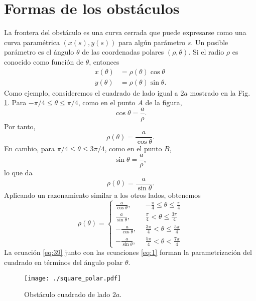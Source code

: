 \documentclass[11pt]{article}
\begin{document}
\section{Formas de los obstáculos}
La frontera del obstáculo es una curva cerrada que puede expresarse como una curva paramétrica $(x(s),y(s))$ para algún parámetro $s$. Un posible parámetro es el ángulo $\theta$ de las coordenadas polares  $(\rho, \theta)$. Si el radio $\rho$ es conocido como función de $\theta$, entonces
\begin{subequations}
  \label{eq:1}
  \begin{align}
    x(\theta) &= \rho(\theta)\cos\theta \\
    y(\theta) &= \rho(\theta)\sin\theta.
  \end{align}
\end{subequations}
Como ejemplo, consideremos el cuadrado de lado igual a  $2a$ mostrado en la Fig. \ref{fig:square_polar}. Para $-\pi/4 \le \theta \le \pi/4$, como en el punto $A$ de la figura,
\begin{equation}
  \label{eq:37}
  \cos\theta = \frac{a}{\rho}.
\end{equation}
Por tanto,
\begin{equation}
  \label{eq:30}
  \rho(\theta) = \frac{a}{\cos\theta}.
\end{equation}
En cambio, para $\pi/4 \le \theta \le 3\pi/4$, como en el punto $B$,
\begin{equation}
  \label{eq:36}
    \sin\theta = \frac{a}{\rho},
  \end{equation}
 lo que da
  \begin{equation}
    \label{eq:38}
  \rho(\theta) = \frac{a}{\sin\theta}.    
  \end{equation}
Aplicando un razonamiento similar a los otros lados, obtenemos
  \begin{equation}
    \label{eq:39}
    \rho(\theta) =
    \begin{cases}
      \frac{a}{\cos\theta},~~&-\frac{\pi}{4} \le \theta \le \frac{\pi}{4}  \\
      \frac{a}{\sin\theta},~~&\frac{\pi}{4} < \theta \le \frac{3\pi}{4} \\
      -\frac{a}{\cos\theta},~~&\frac{3\pi}{4} < \theta \le \frac{5\pi}{4}  \\
      -\frac{a}{\sin\theta},~~&\frac{5\pi}{4} < \theta < \frac{7\pi}{4} 
    \end{cases}
  \end{equation}
La ecuación \eqref{eq:39} junto con las ecuaciones \eqref{eq:1} forman la parametrización del cuadrado en términos del ángulo polar $\theta$.
\begin{figure}[h]
  \centering
  \texttt{[image: ./square\_polar.pdf]}
  \caption{Obstáculo cuadrado de lado $2a$.}
  \label{fig:square_polar}
\end{figure}
\end{document}
